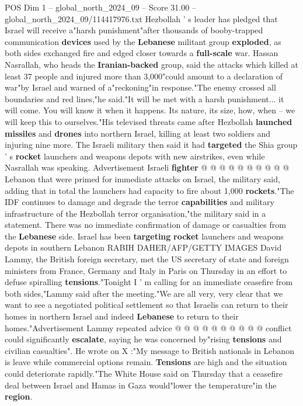 \begin{textsample}{POS Dim 1 – global\_north\_2024\_09 – Score 31.00 – global\_north\_2024\_09/114417976.txt}  \label{ex:f1_pos_091}
Hezbollah ' s leader has pledged that Israel will receive a"harsh punishment"after thousands of booby-trapped communication \textbf{devices} used by the \textbf{Lebanese} militant group \textbf{exploded}, as both sides exchanged fire and edged closer towards a \textbf{full-scale} war.
Hassan Nasrallah, who heads the \textbf{Iranian-backed} group, said the attacks which killed at least 37 people and injured more than 3,000"could amount to a declaration of war"by Israel and warned of a"reckoning"in response."The enemy crossed all boundaries and red lines,"he said."It will be met with a harsh punishment... it will come.
You will know it when it happens.
Its nature, its size, how, when -- we will keep this to ourselves."His televised threats came after Hezbollah \textbf{launched} \textbf{missiles} and \textbf{drones} into northern Israel, killing at least two soldiers and injuring nine more.
The Israeli military then said it had \textbf{targeted} the Shia group ' s \textbf{rocket} launchers and weapons depots with new airstrikes, even while Nasrallah was speaking.
Advertisement Israeli \textbf{fighter} @ @ @ @ @ @ @ @ @ @ Lebanon that were primed for immediate attacks on Israel, the military said, adding that in total the launchers had capacity to fire about 1,000 \textbf{rockets}."The IDF continues to damage and degrade the terror \textbf{capabilities} and military infrastructure of the Hezbollah terror organisation,"the military said in a statement.
There was no immediate confirmation of damage or casualties from the \textbf{Lebanese} side.
Israel has been \textbf{targeting} \textbf{rocket} launchers and weapons depots in southern Lebanon RABIH DAHER/AFP/GETTY IMAGES David Lammy, the British foreign secretary, met the US secretary of state and foreign ministers from France, Germany and Italy in Paris on Thursday in an effort to defuse spiralling \textbf{tensions}."Tonight I ' m calling for an immediate ceasefire from both sides,"Lammy said after the meeting."We are all very, very clear that we want to see a negotiated political settlement so that Israelis can return to their homes in northern Israel and indeed \textbf{Lebanese} to return to their homes."Advertisement Lammy repeated advice @ @ @ @ @ @ @ @ @ @ conflict could significantly \textbf{escalate}, saying he was concerned by"rising \textbf{tensions} and civilian casualties".
He wrote on X :"My message to British nationals in Lebanon is leave while commercial options remain. \textbf{Tensions} are high and the situation could deteriorate rapidly."The White House said on Thursday that a ceasefire deal between Israel and Hamas in Gaza would"lower the temperature"in the \textbf{region}.

\end{textsample}

